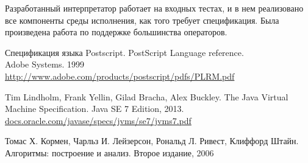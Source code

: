 Разработанный интерпретатор работает на входных тестах, и в нем реализовано все компоненты среды исполнения, как того требует спецификация. Была произведена работа по поддержке большинства операторов.

\begin{thebibliography}{99}

Спецификация языка Postscript. PostScript Language reference. \\
Adobe Systems. 1999\\
\url{http://www.adobe.com/products/postscript/pdfs/PLRM.pdf}

Tim Lindholm, Frank Yellin, Gilad Bracha, Alex Buckley.
The Java Virtual Machine Specification.
Java SE 7 Edition, 2013. \\
\url{docs.oracle.com/javase/specs/jvms/se7/jvms7.pdf}

 Томас Х. Кормен, Чарльз И. Лейзерсон, Рональд Л. Ривест, Клиффорд Штайн.
Алгоритмы: построение и анализ.
Второе издание, 2006

\end{thebibliography}
